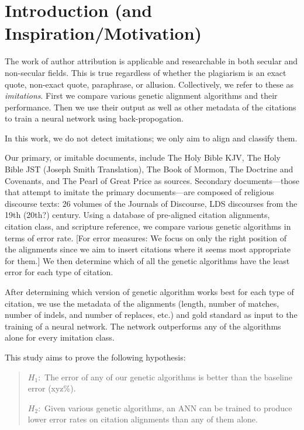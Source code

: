 \section {Introduction (and Inspiration/Motivation)}

The work of author attribution is applicable and researchable in both secular and non-secular fields. This is true regardless of whether the plagiarism is an exact quote, non-exact quote, paraphrase, or allusion. Collectively, we refer to these as \textit{imitations}. First we compare various genetic alignment algorithms and their performance. Then we use their output as well as other metadata of the citations to train a neural network using back-propogation. 

In this work, we do not detect imitations; we only aim to align and classify them. 

Our primary, or imitable documents, include The Holy Bible KJV, The Holy Bible JST (Joseph Smith Translation), The Book of Mormon, The Doctrine and Covenants, and The Pearl of Great Price as sources. Secondary documents---those that attempt to imitate the primary documents---are composed of religious discourse texts: 26 volumes of the Journals of Discourse, LDS discourses from the 19th (20th?) century. Using a database of pre-aligned citation alignments, citation class, and scripture reference, we compare various genetic algorithms in terms of error rate. %
[For error measures: We focus on only the right position of the alignments since we aim to insert citations where it seems most appropriate for them.] We then determine which of all the genetic algorithms have the least error for each type of citation.

After determining which version of genetic algorithm works best for each type of citation, we use the metadata of the alignments (length, number of matches, number of indels, and number of replaces, etc.) and gold standard as input to the training of a neural network. %
The network outperforms any of the algorithms alone for every imitation class.

This study aims to prove the following hypothesis:
	\begin{quote}
		$H_{1}:$ The error of any of our genetic algorithms is better than the baseline error (xyz\%).

		$H_{2}:$ Given various genetic algorithms, an ANN can be trained to produce lower error rates on citation alignments than any of them alone.

	\end{quote}

